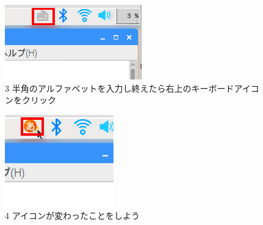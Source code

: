 \documentclass[a4paper,12pt]{jarticle}
\begin{document}
\begin{figure}[ht]
  \begin{minipage}{\textwidth}
    \begin{minipage}{0.45\textwidth}
      \includegraphics[width=0.75\linewidth]{textbook-img059.png}\\
      3 半角のアルファベットを入力し終えたら右上のキーボードアイコンをクリック
    \end{minipage}
    \begin{minipage}{2.582cm}
    \end{minipage}
    \begin{minipage}{0.45\textwidth}
      \includegraphics[width=0.75\linewidth]{textbook-img062.png}\\
      4 アイコンが変わったことをしよう
    \end{minipage}
  \end{minipage}


\end{figure}
\end{document}
